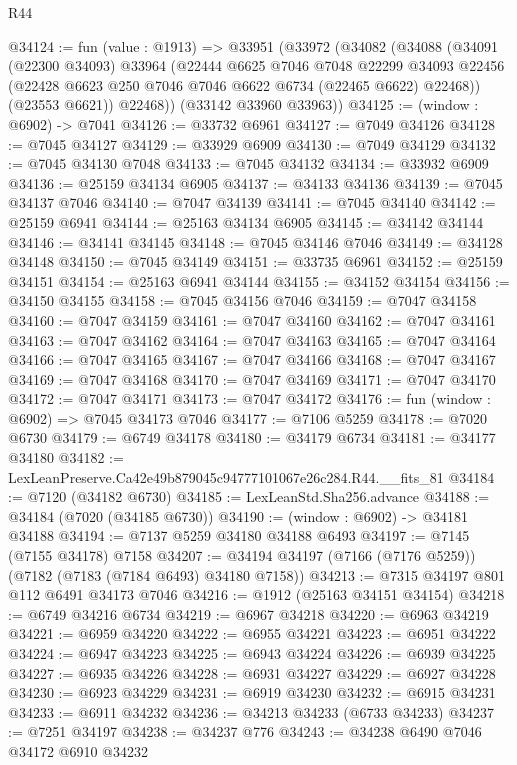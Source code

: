 \begin{lexlean}{R44}
\begin{coremodule}
{@34124 := fun (value : @1913) =>
  @33951
    (@33972
      (@34082
        (@34088
          (@34091
            (@22300 @34093)
            @33964
            (@22444
              @6625
              @7046
              @7048
              @22299
              @34093
              @22456
              (@22428 @6623 @250 @7046 @7046 @6622 @6734 (@22465 @6622) @22468))
            (@23553 @6621))
          @22468))
      (@33142 @33960 @33963))
@34125 := (window : @6902) -> @7041
@34126 := @33732 @6961
@34127 := @7049 @34126
@34128 := @7045 @34127
@34129 := @33929 @6909
@34130 := @7049 @34129
@34132 := @7045 @34130 @7048
@34133 := @7045 @34132
@34134 := @33932 @6909
@34136 := @25159 @34134 @6905
@34137 := @34133 @34136
@34139 := @7045 @34137 @7046
@34140 := @7047 @34139
@34141 := @7045 @34140
@34142 := @25159 @6941
@34144 := @25163 @34134 @6905
@34145 := @34142 @34144
@34146 := @34141 @34145
@34148 := @7045 @34146 @7046
@34149 := @34128 @34148
@34150 := @7045 @34149
@34151 := @33735 @6961
@34152 := @25159 @34151
@34154 := @25163 @6941 @34144
@34155 := @34152 @34154
@34156 := @34150 @34155
@34158 := @7045 @34156 @7046
@34159 := @7047 @34158
@34160 := @7047 @34159
@34161 := @7047 @34160
@34162 := @7047 @34161
@34163 := @7047 @34162
@34164 := @7047 @34163
@34165 := @7047 @34164
@34166 := @7047 @34165
@34167 := @7047 @34166
@34168 := @7047 @34167
@34169 := @7047 @34168
@34170 := @7047 @34169
@34171 := @7047 @34170
@34172 := @7047 @34171
@34173 := @7047 @34172
@34176 := fun (window : @6902) => @7045 @34173 @7046
@34177 := @7106 @5259
@34178 := @7020 @6730
@34179 := @6749 @34178
@34180 := @34179 @6734
@34181 := @34177 @34180
@34182 := LexLeanPreserve.Ca42e49b879045c94777101067e26c284.R44.__fits_81
@34184 := @7120 (@34182 @6730)
@34185 := LexLeanStd.Sha256.advance
@34188 := @34184 (@7020 (@34185 @6730))
@34190 := (window : @6902) -> @34181 @34188
@34194 := @7137 @5259 @34180 @34188 @6493
@34197 := @7145 (@7155 @34178) @7158
@34207 := @34194 @34197 (@7166 (@7176 @5259)) (@7182 (@7183 (@7184 @6493) @34180 @7158))
@34213 := @7315 @34197 @801 @112 @6491 @34173 @7046
@34216 := @1912 (@25163 @34151 @34154)
@34218 := @6749 @34216 @6734
@34219 := @6967 @34218
@34220 := @6963 @34219
@34221 := @6959 @34220
@34222 := @6955 @34221
@34223 := @6951 @34222
@34224 := @6947 @34223
@34225 := @6943 @34224
@34226 := @6939 @34225
@34227 := @6935 @34226
@34228 := @6931 @34227
@34229 := @6927 @34228
@34230 := @6923 @34229
@34231 := @6919 @34230
@34232 := @6915 @34231
@34233 := @6911 @34232
@34236 := @34213 @34233 (@6733 @34233)
@34237 := @7251 @34197
@34238 := @34237 @776
@34243 := @34238 @6490 @7046 @34172 @6910 @34232
}
\end{coremodule}
\end{lexlean}
